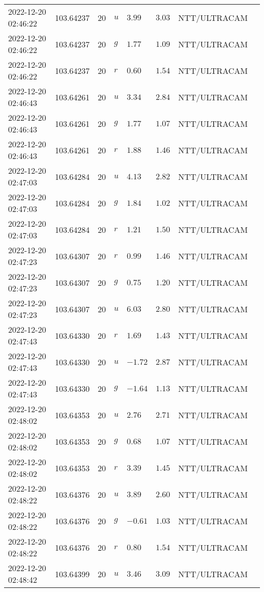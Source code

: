 \documentclass{nature_plusfigure}
\begin{document}
\begin{supplement}
\begin{center}
\begin{longtable}{llllllll}
2022-12-20 02:46:22 & 103.64237 & 20 & $u$ & $3.99$ & $3.03$ & NTT/ULTRACAM &  \\ 
2022-12-20 02:46:22 & 103.64237 & 20 & $g$ & $1.77$ & $1.09$ & NTT/ULTRACAM &  \\ 
2022-12-20 02:46:22 & 103.64237 & 20 & $r$ & $0.60$ & $1.54$ & NTT/ULTRACAM &  \\ 
2022-12-20 02:46:43 & 103.64261 & 20 & $u$ & $3.34$ & $2.84$ & NTT/ULTRACAM &  \\ 
2022-12-20 02:46:43 & 103.64261 & 20 & $g$ & $1.77$ & $1.07$ & NTT/ULTRACAM &  \\ 
2022-12-20 02:46:43 & 103.64261 & 20 & $r$ & $1.88$ & $1.46$ & NTT/ULTRACAM &  \\ 
2022-12-20 02:47:03 & 103.64284 & 20 & $u$ & $4.13$ & $2.82$ & NTT/ULTRACAM &  \\ 
2022-12-20 02:47:03 & 103.64284 & 20 & $g$ & $1.84$ & $1.02$ & NTT/ULTRACAM &  \\ 
2022-12-20 02:47:03 & 103.64284 & 20 & $r$ & $1.21$ & $1.50$ & NTT/ULTRACAM &  \\ 
2022-12-20 02:47:23 & 103.64307 & 20 & $r$ & $0.99$ & $1.46$ & NTT/ULTRACAM &  \\ 
2022-12-20 02:47:23 & 103.64307 & 20 & $g$ & $0.75$ & $1.20$ & NTT/ULTRACAM &  \\ 
2022-12-20 02:47:23 & 103.64307 & 20 & $u$ & $6.03$ & $2.80$ & NTT/ULTRACAM &  \\ 
2022-12-20 02:47:43 & 103.64330 & 20 & $r$ & $1.69$ & $1.43$ & NTT/ULTRACAM &  \\ 
2022-12-20 02:47:43 & 103.64330 & 20 & $u$ & $-1.72$ & $2.87$ & NTT/ULTRACAM &  \\ 
2022-12-20 02:47:43 & 103.64330 & 20 & $g$ & $-1.64$ & $1.13$ & NTT/ULTRACAM &  \\ 
2022-12-20 02:48:02 & 103.64353 & 20 & $u$ & $2.76$ & $2.71$ & NTT/ULTRACAM &  \\ 
2022-12-20 02:48:02 & 103.64353 & 20 & $g$ & $0.68$ & $1.07$ & NTT/ULTRACAM &  \\ 
2022-12-20 02:48:02 & 103.64353 & 20 & $r$ & $3.39$ & $1.45$ & NTT/ULTRACAM &  \\ 
2022-12-20 02:48:22 & 103.64376 & 20 & $u$ & $3.89$ & $2.60$ & NTT/ULTRACAM &  \\ 
2022-12-20 02:48:22 & 103.64376 & 20 & $g$ & $-0.61$ & $1.03$ & NTT/ULTRACAM &  \\ 
2022-12-20 02:48:22 & 103.64376 & 20 & $r$ & $0.80$ & $1.54$ & NTT/ULTRACAM &  \\ 
2022-12-20 02:48:42 & 103.64399 & 20 & $u$ & $3.46$ & $3.09$ & NTT/ULTRACAM &  \\ 

\end{longtable}
\end{center}
\end{supplement}
\end{document}
